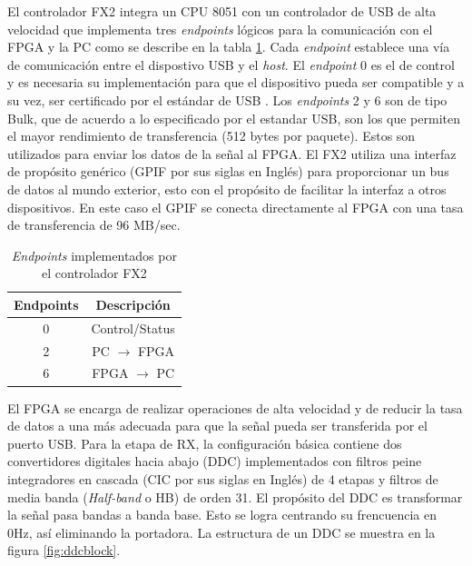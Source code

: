 El controlador FX2 integra un CPU 8051 con un controlador de USB de alta velocidad que implementa tres
\emph{endpoints} l\'ogicos para la comunicaci\'on con el FPGA y la PC como se describe en la tabla
\ref{tbl:endpoints}. Cada \emph{endpoint} establece una v\'ia de comunicaci\'on entre el dispostivo
USB y el \emph{host}. El \emph{endpoint} 0 es el de control y es necesaria su implementaci\'on para que el
dispositivo pueda ser compatible y a su vez, ser certificado por el est\'andar de USB \cite{usb}.
Los \emph{endpoints} 2 y 6 son de tipo Bulk, que de acuerdo a lo especificado por el estandar USB, son los que
permiten el mayor rendimiento de transferencia (512 bytes por paquete). Estos son utilizados para
enviar los datos de la se\~nal al FPGA. El FX2 utiliza una interfaz de prop\'osito gen\'erico (GPIF por sus siglas en Ingl\'es)
para proporcionar un bus de datos al mundo exterior, esto con el prop\'osito de facilitar la
interfaz a otros dispositivos. En este caso el GPIF se conecta directamente al FPGA con una tasa de
transferencia de 96 MB/sec.

\begin{table}[htp]
\begin{center}
	\begin{tabular}{|c|c|}
		\hline
		\textbf{Endpoints} & \textbf{Descripci\'on} \\
		\hline
		0 & Control/Status \\
		\hline
		2 & PC $\rightarrow$ FPGA \\
		\hline
		6 & FPGA $\rightarrow$ PC \\
		\hline
	\end{tabular}
	\vspace{0.5in}
	\caption{\emph{Endpoints} implementados por el controlador FX2}
	\label{tbl:endpoints}
\end{center}
\end{table}

El FPGA se encarga de realizar operaciones de alta velocidad y de reducir
la tasa de datos a una m\'as adecuada para que la se\~nal pueda ser transferida
por el puerto USB. Para la etapa de RX, la configuraci\'on b\'asica contiene dos
convertidores digitales hacia abajo (DDC) implementados con filtros peine integradores en cascada (CIC por sus siglas en Ingl\'es)
de 4 etapas y filtros de media banda (\emph{Half-band} o HB) de orden 31. El prop\'osito del DDC es transformar la se\~nal pasa
bandas a banda base. Esto se logra centrando su frencuencia en 0Hz, as\'i eliminando la portadora. La estructura de un DDC se
muestra en la figura \ref{fig:ddcblock}.

